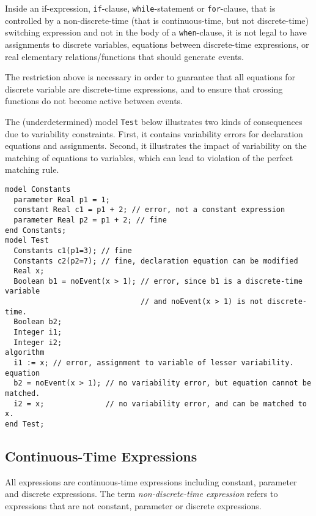Inside an if-expression, \lstinline!if!-clause, \lstinline!while!-statement or \lstinline!for!-clause, that
is controlled by a non-discrete-time (that is continuous-time, but not
discrete-time) switching expression and not in the body of a
\lstinline!when!-clause, it is not legal to have assignments to discrete variables,
equations between discrete-time expressions, or real elementary
relations/functions that should generate events.

\begin{nonnormative}
The restriction above is necessary in order to guarantee that all equations for discrete variable are discrete-time expressions, and to ensure that crossing
functions do not become active between events.
\end{nonnormative}

\begin{example}
The (underdetermined) model \lstinline!Test! below illustrates two kinds of consequences due to variability constraints.
First, it contains variability errors for declaration equations and assignments.
Second, it illustrates the impact of variability on the matching of equations to variables, which can
lead to violation of the perfect matching rule.
\begin{lstlisting}[language=modelica]
model Constants
  parameter Real p1 = 1;
  constant Real c1 = p1 + 2; // error, not a constant expression
  parameter Real p2 = p1 + 2; // fine
end Constants;
model Test
  Constants c1(p1=3); // fine
  Constants c2(p2=7); // fine, declaration equation can be modified
  Real x;
  Boolean b1 = noEvent(x > 1); // error, since b1 is a discrete-time variable
                               // and noEvent(x > 1) is not discrete-time.
  Boolean b2;
  Integer i1;
  Integer i2;
algorithm
  i1 := x; // error, assignment to variable of lesser variability.
equation
  b2 = noEvent(x > 1); // no variability error, but equation cannot be matched.
  i2 = x;              // no variability error, and can be matched to x.
end Test;
\end{lstlisting}
\end{example}

\subsection{Continuous-Time Expressions}\label{continuous-time-expressions}

All expressions are continuous-time expressions including constant,
parameter and discrete expressions. The term \emph{non-discrete-time
expression} refers to expressions that are not constant, parameter or
discrete expressions.
